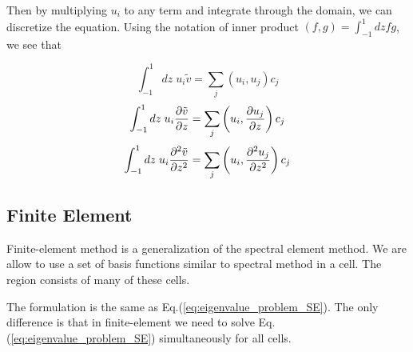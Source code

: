 Then by multiplying $u_{i}$ to any term and integrate through the domain, we can discretize the equation. Using the notation of inner product $(f,g)=\int_{-1}^{1} dz fg$, we see that

\[ \int_{-1}^{1} dz \; u_i\tilde{v} = \sum_{j}(u_i,u_j)c_j \]
\[ \int_{-1}^{1} dz \; u_i\pdv{\tilde{v}}{z} = \sum_{j}\left(u_i,\pdv{u_j}{z}\right)c_j \]
\[ \int_{-1}^{1} dz \; u_i\pdv[2]{\tilde{v}}{z} = \sum_{j}\left(u_i,\pdv[2]{u_j}{z}\right)c_j \]

\subsection{Finite Element}
Finite-element method is a generalization of the spectral element method. We are allow to use a set of basis functions similar to spectral method in a cell. The region consists of many of these cells.

The formulation is the same as Eq.(\ref{eq:eigenvalue_problem_SE}). The only difference is that in finite-element we need to solve Eq.(\ref{eq:eigenvalue_problem_SE}) simultaneously for all cells.